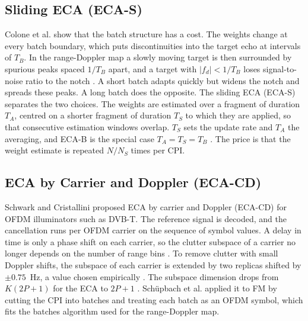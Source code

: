 \subsection{Sliding ECA (ECA-S)}
\label{subsec:th.dsi.ecas}
\todo{}
Colone et al. \citep{colone2016} show that the batch structure has a cost. The weights change at every batch boundary, which puts discontinuities into the target echo at intervals of $T_B$. In the range-Doppler map a slowly moving target is then surrounded by spurious peaks spaced $1/T_B$ apart, and a target with $|f_d| < 1/T_B$ loses signal-to-noise ratio to the notch \citep{colone2016}. A short batch adapts quickly but widens the notch and spreads these peaks. A long batch does the opposite. The sliding ECA (ECA-S) separates the two choices. The weights are estimated over a fragment of duration $T_A$, centred on a shorter fragment of duration $T_S$ to which they are applied, so that consecutive estimation windows overlap. $T_S$ sets the update rate and $T_A$ the averaging, and ECA-B is the special case $T_A = T_S = T_B$ \citep{colone2016}. The price is that the weight estimate is repeated $N/N_S$ times per CPI.

\subsection{ECA by Carrier and Doppler (ECA-CD)}
\label{subsec:th.dsi.ecacd}
\todo{}
Schwark and Cristallini \citep{schwark2016} proposed ECA by carrier and Doppler (ECA-CD) for OFDM illuminators such as DVB-T. The reference signal is decoded, and the cancellation runs per OFDM carrier on the sequence of symbol values. A delay in time is only a phase shift on each carrier, so the clutter subspace of a carrier no longer depends on the number of range bins \citep{schwark2016,schuepbach2020}. To remove clutter with small Doppler shifts, the subspace of each carrier is extended by two replicas shifted by $\pm 0.75$~Hz, a value chosen empirically \citep{schwark2016}. The subspace dimension drops from $K(2P+1)$ for the ECA to $2P+1$ \citep{schuepbach2020}. Schüpbach et al. \citep{schuepbach2020} applied it to FM by cutting the CPI into batches and treating each batch as an OFDM symbol, which fits the batches algorithm used for the range-Doppler map.

